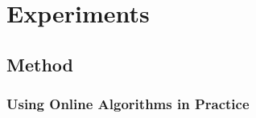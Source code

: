 
\chapter{Experiments}\label{chapter:experiments}

\section{Method}

\subsection{Using Online Algorithms in Practice}
